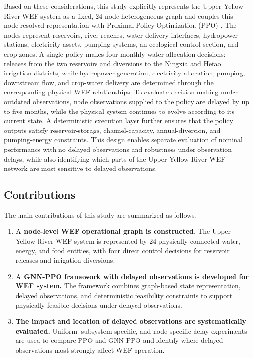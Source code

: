 \documentclass [a4paper,fleqn] {cas-dc}
\begin{document}
Based on these considerations, this study explicitly represents the Upper Yellow River WEF system as a fixed, 24-node heterogeneous graph and couples this node-resolved representation with Proximal Policy Optimization (PPO) \citep{yu2022}. The nodes represent reservoirs, river reaches, water-delivery interfaces, hydropower stations, electricity assets, pumping systems, an ecological control section, and crop zones. A single policy makes four monthly water-allocation decisions: releases from the two reservoirs and diversions to the Ningxia and Hetao irrigation districts, while hydropower generation, electricity allocation, pumping, downstream flow, and crop-water delivery are determined through the corresponding physical WEF relationships. To evaluate decision making under outdated observations, node observations supplied to the policy are delayed by up to five months, while the physical system continues to evolve according to its current state. A deterministic execution layer further ensures that the policy outputs satisfy reservoir-storage, channel-capacity, annual-diversion, and pumping-energy constraints. This design enables separate evaluation of nominal performance with no delayed observations and robustness under observation delays, while also identifying which parts of the Upper Yellow River WEF network are most sensitive to delayed observations.



\subsection{Contributions}
\label{sec12}

The main contributions of this study are summarized as follows.

\begin{enumerate}

    \item \textbf{A node-level WEF operational graph is constructed.}
    The Upper Yellow River WEF system is represented by 24 physically connected water, energy, and food entities, with four direct control decisions for reservoir releases and irrigation diversions.

    \item \textbf{A GNN-PPO framework with delayed observations is developed for WEF system.}
    The framework combines graph-based state representation, delayed observations, and deterministic feasibility constraints to support physically feasible decisions under delayed observations.

    \item \textbf{The impact and location of delayed observations are systematically evaluated.}
    Uniform, subsystem-specific, and node-specific delay experiments are used to compare PPO and GNN-PPO and identify where delayed observations most strongly affect WEF operation.

\end{enumerate}
\end{document}
